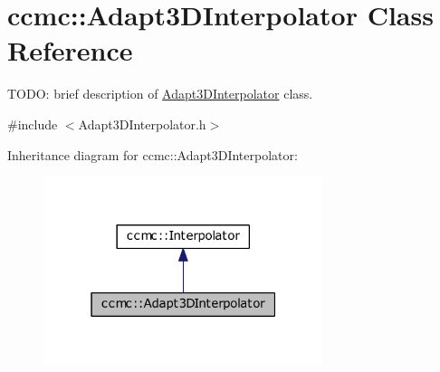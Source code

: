 \hypertarget{classccmc_1_1_adapt3_d_interpolator}{\section{ccmc\-:\-:Adapt3\-D\-Interpolator Class Reference}
\label{classccmc_1_1_adapt3_d_interpolator}
}


T\-O\-D\-O\-: brief description of \hyperlink{classccmc_1_1_adapt3_d_interpolator}{Adapt3\-D\-Interpolator} class.  




{\ttfamily \#include $<$Adapt3\-D\-Interpolator.\-h$>$}



Inheritance diagram for ccmc\-:\-:Adapt3\-D\-Interpolator\-:\nopagebreak
\begin{figure}[H]
\begin{center}
\leavevmode
\includegraphics[width=232pt]{classccmc_1_1_adapt3_d_interpolator__inherit__graph}
\end{center}
\end{figure}


